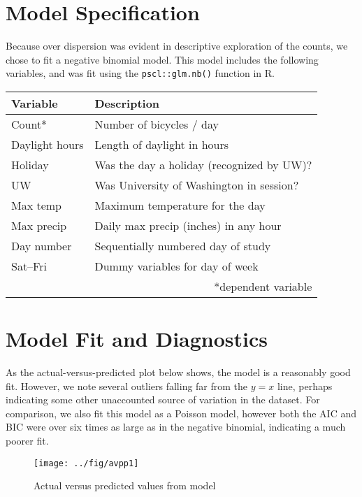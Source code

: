 \documentclass[final]{beamer}
\begin{document}
\begin{frame}[t]
\begin{multicols}{3}
\section{Model Specification}
Because over dispersion was evident in descriptive exploration of the
counts, we chose to fit a negative binomial model. This model includes
the following variables, and was fit using the \texttt{pscl::glm.nb()}
function in R.

\begin{table}[htdp]
\begin{center}
\begin{tabular}{ll}
  \hline\hline
  Variable & Description \\
  \hline
  Count* & Number of bicycles / day \\
  Daylight hours & Length of daylight in hours \\
  Holiday & Was the day a holiday (recognized by UW)? \\
  UW & Was University of Washington in session? \\
  Max temp & Maximum temperature for the day \\
  Max precip & Daily max precip (inches) in any hour \\
  Day number & Sequentially numbered day of study \\
  Sat--Fri & Dummy variables for day of week \\
  \hline\hline
    & \multicolumn{1}{r}{*dependent variable}
\end{tabular}
\end{center}
\label{default}
\end{table}%

\newpage
\section{Model Fit and Diagnostics}

As the actual-versus-predicted plot below shows, the model is a
reasonably good fit. However, we note several outliers falling far
from the $y=x$ line, perhaps indicating some other unaccounted source
of variation in the dataset. For comparison, we also fit this model as
a Poisson model, however both the AIC and BIC were over six times as
large as in the negative binomial, indicating a much poorer fit.

\begin{figure}[htbp]
\begin{center}
\texttt{[image: ../fig/avpp1]}
\caption{Actual versus predicted values from model}
\label{fg:avp}
\end{center}
\end{figure}


\end{multicols}
\end{frame}
\end{document}
